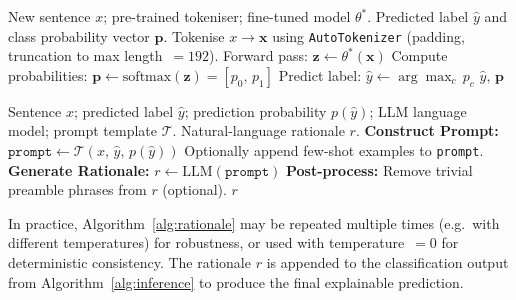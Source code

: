 \begin{algorithm}[H]
\caption{Inference for Sarcasm Classification}\label{alg:inference}
\begin{algorithmic}[1]
\Require New sentence $x$; pre-trained tokeniser; fine-tuned model $\theta^{*}$.
\Ensure Predicted label $\hat{y}$ and class probability vector $\mathbf{p}$.
\Statex
\State Tokenise $x \to \mathbf{x}$ using \texttt{AutoTokenizer} (padding, truncation to max length~$= 192$).
\State Forward pass: $\mathbf{z} \gets \theta^{*}(\mathbf{x})$ 
\State Compute probabilities: $\mathbf{p} \gets \text{softmax}(\mathbf{z}) = [p_0,\, p_1]$
\State Predict label: $\hat{y} \gets \arg\max_{c}\, p_c$
\State \Return $\hat{y},\, \mathbf{p}$
\end{algorithmic}
\end{algorithm}

\begin{algorithm}[H]
\caption{Generate LLM Rationale (Explainability)}\label{alg:rationale}
\begin{algorithmic}[1]
\Require Sentence $x$; predicted label $\hat{y}$; prediction probability $p(\hat{y})$; LLM language model; prompt template $\mathcal{T}$.
\Ensure Natural-language rationale $r$.
\Statex
\State \textbf{Construct Prompt:}
\State $\texttt{prompt} \gets \mathcal{T}(x,\, \hat{y},\, p(\hat{y}))$
\Statex {}
\State Optionally append few-shot examples to \texttt{prompt}.
\Statex
\State \textbf{Generate Rationale:}
\State $r \gets \text{LLM}(\texttt{prompt})$ 
\Statex
\State \textbf{Post-process:} Remove trivial preamble phrases from $r$ (optional).
\State \Return $r$
\end{algorithmic}
\end{algorithm}

\begin{remark}
In practice, Algorithm~\ref{alg:rationale} may be repeated multiple times (e.g.\ with different temperatures) for robustness, or used with temperature~$= 0$ for deterministic consistency. The rationale $r$ is appended to the classification output from Algorithm~\ref{alg:inference} to produce the final explainable prediction.
\end{remark}

